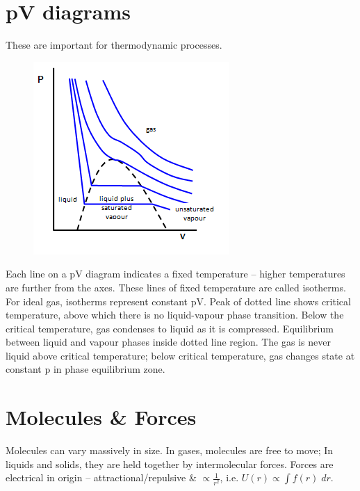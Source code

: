 \documentclass[a4paper, 11pt, normalem]{report}
\begin{document}
\section{pV diagrams}
These are important for thermodynamic processes.
\begin{figure}[H]
    \centering
    \includegraphics{pV.png}
\end{figure}
Each line on a pV diagram indicates a fixed temperature -- higher temperatures are further from the axes.
These lines of fixed temperature are called isotherms.
For ideal gas, isotherms represent constant pV.
Peak of dotted line shows critical temperature, above which there is no liquid-vapour phase transition.
Below the critical temperature, gas condenses to liquid as it is compressed.
Equilibrium between liquid and vapour phases inside dotted line region.
The gas is never liquid above critical temperature; below critical temperature, gas changes state at constant p in phase equilibrium zone.

\section{Molecules \& Forces}
Molecules can vary massively in size.
In gases, molecules are free to move; In liquids and solids, they are held together by intermolecular forces.
Forces are electrical in origin -- attractional/repulsive \& $\propto \frac{1}{r^{2}}$, i.e. $U(r)\propto\int\! f(r)\; dr$.
\end{document}

